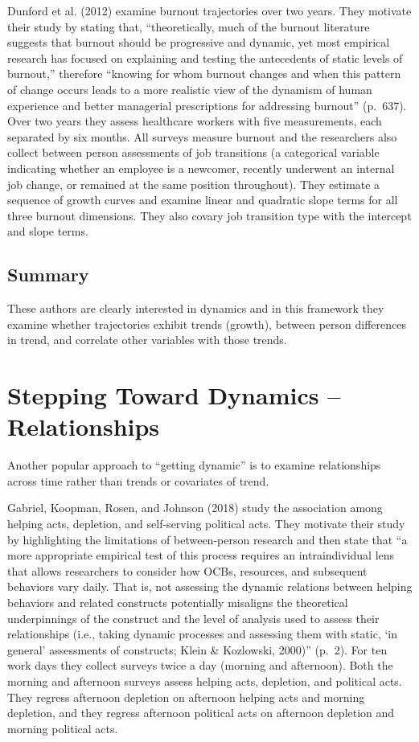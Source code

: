 \documentclass[english,,man]{apa6}
\theoremstyle{definition}
\theoremstyle{definition}
\theoremstyle{definition}
\theoremstyle{remark}
\begin{document}
Dunford et al. (2012) examine burnout trajectories over two years. They
motivate their study by stating that, \enquote{theoretically, much of
the burnout literature suggests that burnout should be progressive and
dynamic, yet most empirical research has focused on explaining and
testing the antecedents of static levels of burnout,} therefore
\enquote{knowing for whom burnout changes and when this pattern of
change occurs leads to a more realistic view of the dynamism of human
experience and better managerial prescriptions for addressing burnout}
(p.~637). Over two years they assess healthcare workers with five
measurements, each separated by six months. All surveys measure burnout
and the researchers also collect between person assessments of job
transitions (a categorical variable indicating whether an employee is a
newcomer, recently underwent an internal job change, or remained at the
same position throughout). They estimate a sequence of growth curves and
examine linear and quadratic slope terms for all three burnout
dimensions. They also covary job transition type with the intercept and
slope terms.

\hypertarget{summary}{%
\subsection{Summary}\label{summary}}

These authors are clearly interested in dynamics and in this framework
they examine whether trajectories exhibit trends (growth), between
person differences in trend, and correlate other variables with those
trends.

\hypertarget{stepping-toward-dynamics-relationships}{%
\section{Stepping Toward Dynamics --
Relationships}\label{stepping-toward-dynamics-relationships}}

Another popular approach to \enquote{getting dynamic} is to examine
relationships across time rather than trends or covariates of trend.

Gabriel, Koopman, Rosen, and Johnson (2018) study the association among
helping acts, depletion, and self-serving political acts. They motivate
their study by highlighting the limitations of between-person research
and then state that \enquote{a more appropriate empirical test of this
process requires an intraindividual lens that allows researchers to
consider how OCBs, resources, and subsequent behaviors vary daily. That
is, not assessing the dynamic relations between helping behaviors and
related constructs potentially misaligns the theoretical underpinnings
of the construct and the level of analysis used to assess their
relationships (i.e., taking dynamic processes and assessing them with
static, \enquote{in general} assessments of constructs; Klein \&
Kozlowski, 2000)} (p.~2). For ten work days they collect surveys twice a
day (morning and afternoon). Both the morning and afternoon surveys
assess helping acts, depletion, and political acts. They regress
afternoon depletion on afternoon helping acts and morning depletion, and
they regress afternoon political acts on afternoon depletion and morning
political acts.
\end{document}
